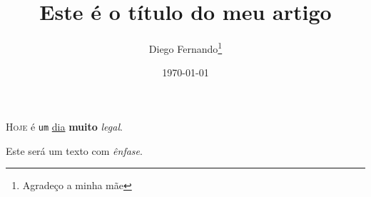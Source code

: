 \documentclass[12pt, a4paper]{article}
\title{Este é o título do meu artigo}
\author{Diego Fernando\thanks{Agradeço a minha mãe}}
\date{\today}
\begin{document}
\textsc{Hoje} é \texttt{um} \underline{dia} \textbf{muito} \textit{legal}.

Este será um texto com \emph{ênfase}.
\end{document}
